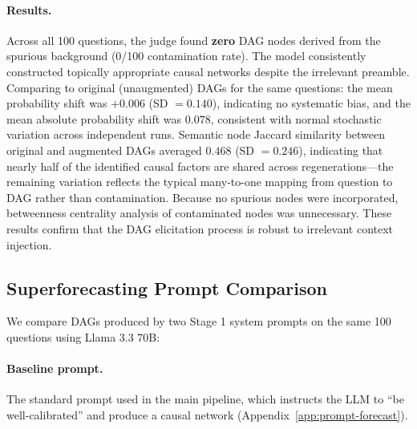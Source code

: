 \documentclass[11pt]{article}
\begin{document}
\paragraph{Results.} Across all 100 questions, the judge found \textbf{zero} DAG nodes derived from the spurious background (0/100 contamination rate). The model consistently constructed topically appropriate causal networks despite the irrelevant preamble. Comparing to original (unaugmented) DAGs for the same questions: the mean probability shift was $+0.006$ (SD $= 0.140$), indicating no systematic bias, and the mean absolute probability shift was $0.078$, consistent with normal stochastic variation across independent runs. Semantic node Jaccard similarity between original and augmented DAGs averaged $0.468$ (SD $= 0.246$), indicating that nearly half of the identified causal factors are shared across regenerations---the remaining variation reflects the typical many-to-one mapping from question to DAG rather than contamination. Because no spurious nodes were incorporated, betweenness centrality analysis of contaminated nodes was unnecessary. These results confirm that the DAG elicitation process is robust to irrelevant context injection.

\subsection{Superforecasting Prompt Comparison}

We compare DAGs produced by two Stage 1 system prompts on the same 100 questions using Llama 3.3 70B:

\paragraph{Baseline prompt.} The standard prompt used in the main pipeline, which instructs the LLM to ``be well-calibrated'' and produce a causal network (Appendix~\ref{app:prompt-forecast}).
\end{document}
